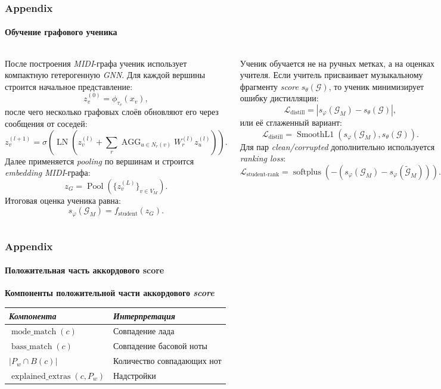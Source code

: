 \documentclass[aspectratio=169]{beamer}
\begin{document}
\begin{frame}
\frametitle{Appendix}
\framesubtitle{Обучение графового ученика}
\vspace{-0.25cm}
{\fontsize{6.1}{7}\selectfont
\setlength{\abovedisplayskip}{1pt}
\setlength{\belowdisplayskip}{1pt}
\begin{columns}[T,totalwidth=\textwidth]
	После построения \textit{MIDI}-графа ученик использует компактную гетерогенную \textit{GNN}. Для каждой вершины строится начальное представление:
	\[
	z_v^{(0)}=\phi_{\tau_v}(x_v),
	\]
	после чего несколько графовых слоёв обновляют его через сообщения от соседей:
	\[
	z_v^{(l+1)}=\sigma\!\left(\operatorname{LN}\!\left(
	z_v^{(l)}+\sum_r\operatorname{AGG}_{u\in N_r(v)}W_r^{(l)}z_u^{(l)}
	\right)\right).
	\]
	Далее применяется \textit{pooling} по вершинам и строится \textit{embedding} \textit{MIDI}-графа:
	\[
	z_G=\operatorname{Pool}\!\left(\{z_v^{(L)}\}_{v\in V_M}\right).
	\]
	Итоговая оценка ученика равна:
	\[
	s_\varphi(\mathcal{G}_M)=f_{\mathrm{student}}(z_G).
	\]

	Ученик обучается не на ручных метках, а на оценках учителя. Если учитель присваивает музыкальному фрагменту \textit{score} $s_\theta(\mathcal{G})$, то ученик минимизирует ошибку дистилляции:
	\[
	\mathcal{L}_{\mathrm{distill}}=
	\left|s_\varphi(\mathcal{G}_M)-s_\theta(\mathcal{G})\right|,
	\]
	или её сглаженный вариант:
	\[
	\mathcal{L}_{\mathrm{distill}}=
	\operatorname{SmoothL1}\!\left(s_\varphi(\mathcal{G}_M),s_\theta(\mathcal{G})\right).
	\]
	Для пар \textit{clean/corrupted} дополнительно используется \textit{ranking loss}:
	\[
	\mathcal{L}_{\mathrm{student\text{-}rank}}=
	\operatorname{softplus}\!\left(-\left(s_\varphi(\mathcal{G}_M)-s_\varphi(\widetilde{\mathcal{G}}_M)\right)\right).
	\]
\end{columns}
}
\end{frame}

\begin{frame}
\frametitle{Appendix}
\framesubtitle{Положительная часть аккордового score}
\hypertarget{positive-score}{}
\vspace{-0.15cm}
{\fontsize{9.5}{11.5}\selectfont
\textbf{Компоненты положительной части аккордового \textit{score}}\\[0.08cm]
\setlength{\tabcolsep}{4pt}
\renewcommand{\arraystretch}{1.18}
\begin{tabular}{@{}p{}p{}@{}}
\toprule
\textit{Компонента} & \textit{Интерпретация} \\
\midrule
$\operatorname{mode\_match}(c)$ & Совпадение лада \\
$\operatorname{bass\_match}(c)$ & Совпадение басовой ноты \\
$|P_w \cap B(c)|$ & Количество совпадающих нот \\
$\operatorname{explained\_extras}(c, P_w)$ & Надстройки \\
\bottomrule
\end{tabular}
}
\end{frame}
\end{document}
